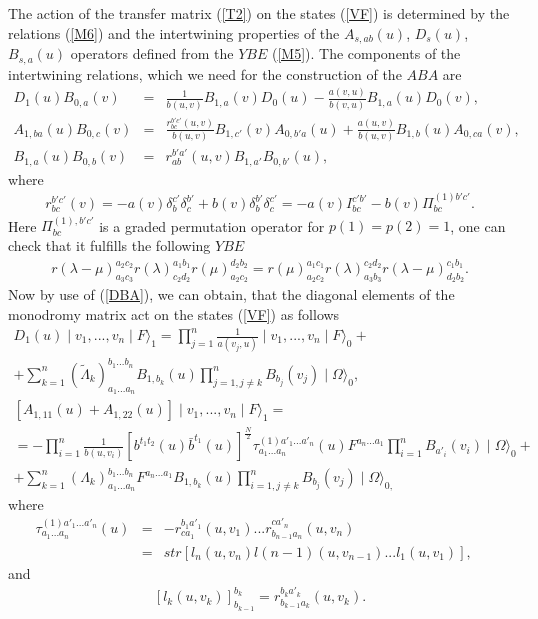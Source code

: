 \documentclass[a4paper,12pt]{article}
\newcommand{\nn}{\nonumber}
\begin{document}
The action of the transfer 
matrix (\ref{T2}) on the states (\ref{VF}) is determined by the relations
(\ref{M6}) and the intertwining properties of the $A_{s,ab}(u)$,
$D_{s}(u)$, $B_{s,a}(u)$ operators defined from the $YBE$ (\ref{M5}).
The components of the intertwining relations, which we need 
for the construction of the $ABA$ are
\begin{eqnarray}
\label{DBA}  
D_{1}(u)B_{0,a}(v)&=&\frac{1}{b(u,v)}B_{1,a}(v)D_{0}(u)-
\frac{a(v,u)}{b(v,u)}B_{1,a}(u)D_{0}(v), \nn\\
A_{1,ba}(u)B_{0,c}(v)&=&\frac{r_{bc}^{b'c'}(u,v)}{b(u,v)}B_{1,c'}(v)A_{0,b'a}(u)
+
\frac{a(u,v)}{b(u,v)}B_{1,b}(u)A_{0,ca}(v),\nn\\
B_{1,a}(u)B_{0,b}(v)&=&r_{ab}^{b'a'}(u,v)B_{1,a'}B_{0,b'}(u),
\end{eqnarray}
where 
\begin{eqnarray}
\label{r}
r_{bc}^{b'c'}(v)=-a(v)\delta_{b}^{c'}\delta_{c}^{b'}+
b(v)\delta_{b}^{b'}\delta_{c}^{c'}=-a(v)I_{bc}^{c'b'}-b(v)\Pi_{bc}^{(1)b'c'}.
\end{eqnarray}
Here $\Pi^{(1),b'c'}_{bc}$ is a graded permutation operator for 
$p(1)=p(2)=1$, one can check that it fulfills the following $YBE$
\begin{eqnarray}
\label{HODVATS}
r(\lambda{-}\mu)_{a_{3}c_{3}}^{a_{2}c_{2}}r(\lambda)_{c_{2}d_{2}}^{{a_1}{b_1}}
r(\mu)_{a_{2}c_{2}}^{{d_2}{b_2}}=r(\mu)_{a_{2}c_{2}}^{a_{1}c_{1}}
r(\lambda)_{a_{3}b_{3}}^{c_{2}d_{2}}r(\lambda{-}\mu)_{d_{2}b_{2}}^{c_{1}b_{1}}.
\end{eqnarray}
Now by use of (\ref{DBA}), we can obtain, that the diagonal elements of the 
monodromy matrix act on the states (\ref{VF}) as follows
\begin{eqnarray}
\label{DVF}
D_{1}(u)\mid{v_{1},...,v_{n}}\mid{F}\rangle_{1} = \prod_{j=1}^{n}
\frac{1}{a(v_{j},u)}\mid{v_{1},...,v_{n}}\mid{F}\rangle_{0}+\nn\\
 +\sum_{k=1}^{n} {({\tilde{\Lambda}}_{k})}_{a_{1}...a_{n}}^{b_{1}...b_{n}}
B_{1,b_{k}}(u)\prod_{j=1,j\neq k}^{n}B_{b_{j}}
(v_{j})\mid{\Omega}\rangle_{0},\nn\\
\left[ A_{1,11}(u) + A_{1,22}(u)\right] \mid v_{1},...,v_{n} \mid{F}
\rangle_{1}= \nn\\
 = -\prod_{i=1}^{n}\frac{1}{b(u,v_{i})}[b^{t_{1}t_{2}}(u)\bar{b}^{t_{1}}(u)]
^{\frac{N}{2}}\tau_{a_{1}...a_{n}}^{(1)a'_{1}...a'_{n}}(u)
F^{a_{n}...a_{1}}\prod_{i=1}^{n}B_{a'_{i}}(v_{i})\mid{\Omega}\rangle_{0}+\nn\\
 + \sum_{k=1}^{n}(\Lambda_{k})_{a_{1}...a_{n}}^{b_{1}...b_{n}}
F^{a_{n}...a_{1}}
B_{1,b_{k}}(u)\prod_{i=1,j\neq k}^{n}B_{b_{j}}(v_{j})\mid{\Omega}\rangle_{0,}
\end{eqnarray}
where 
\begin{eqnarray}
\label{T4}
\tau_{a_{1}...a_{n}}^{(1)a'_{1}...a'_{n}}(u)&=&-
r_{ca_{1}}^{b_{1}a'_{1}}(u,v_{1})...r_{b_{n-1}a_{n}}^{ca'_{n}}(u,v_{n})\nn\\
&=&str[l_{n}(u,v_{n})l{(n-1)}(u,v_{n-1})...l_{1}(u,v_{1})],\;\;\;
\end{eqnarray}
and
\begin{eqnarray}
\label{l}
[l_{k}(u,v_{k})]_{b_{k-1}}^{b_{k}}=r_{b_{k-1}a_{k}}^{b_{k}a'_{k}}(u,v_{k}).
\end{eqnarray}
\end{document}
